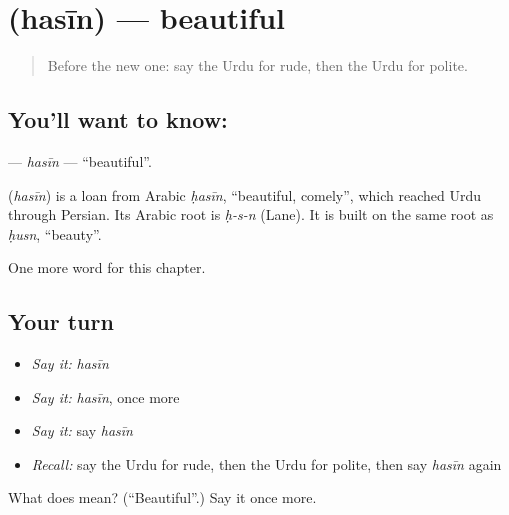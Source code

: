 \section[\texorpdfstring{\ur{حسین} (hasīn)}{حسین (hasīn)}]{ (hasīn) — beautiful}

\label{lesson:UR-C223-hasin}



\begin{quote}
Before the new one: say the Urdu for rude, then the Urdu for polite.
\end{quote}

\subsection*{You'll want to know: }
\textbf{} — \emph{hasīn} — \textquotedblleft{}beautiful\textquotedblright{}.

\begin{cousinweb}
\textbf{} (\emph{hasīn}) is a loan from Arabic \emph{ḥasīn}, \textquotedblleft{}beautiful, comely\textquotedblright{}, which reached Urdu through Persian. Its Arabic root is \emph{ḥ-s-n} (Lane). It is built on the same root as \emph{ḥusn}, \textquotedblleft{}beauty\textquotedblright{}.
\end{cousinweb}

\begin{grammarlens}[title={What you've built}]
One more word for this chapter.
\end{grammarlens}

\subsection*{Your turn}
\begin{itemize}
\raggedright
  \item \emph{Say it:} \emph{hasīn}
  \item \emph{Say it:} \emph{hasīn}, once more
  \item \emph{Say it:} say \emph{hasīn}
  \item \emph{Recall:} say the Urdu for rude, then the Urdu for polite, then say \emph{hasīn} again
\end{itemize}

\begin{tcolorbox}[breakable,colback=teal!4,colframe=teal!35!black,title={Before you move on}]
What does  mean? (\textquotedblleft{}Beautiful\textquotedblright{}.) Say it once more.
\end{tcolorbox}
